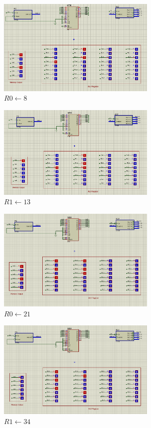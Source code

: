 \documentclass[12pt,onecolumn,a4paper,fleqn]{article}
\begin{document}
    \begin{figure}[H]
      	 							\centering
      	 							\includegraphics[width=0.68\textwidth]{source/17.png}
      	 							\caption{$R0 \leftarrow 8$}
      	 							\label{fig:17}
     \end{figure}
     \begin{figure}[H]
       	 							\centering
       	 							\includegraphics[width=0.68\textwidth]{source/18.png}
       	 							\caption{$R1 \leftarrow 13$}
       	 							\label{fig:18}
      \end{figure}
      \begin{figure}[H]
        	 							\centering
        	 							\includegraphics[width=0.68\textwidth]{source/19.png}
        	 							\caption{$R0 \leftarrow 21$}
        	 							\label{fig:19}
       \end{figure}
       \begin{figure}[H]
         	 							\centering
         	 							\includegraphics[width=0.68\textwidth]{source/20.png}
         	 							\caption{$R1 \leftarrow 34$}
         	 							\label{fig:20}
        \end{figure} 
 
\end{document}
